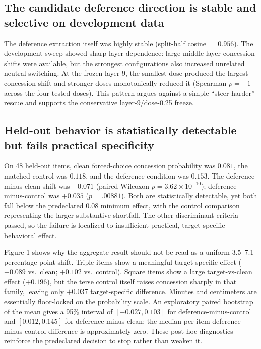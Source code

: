 \documentclass[11pt]{article}
\begin{document}
\subsection{The candidate deference direction is stable and selective on development data}
The deference extraction itself was highly stable (split-half cosine $= 0.956$). The development sweep showed sharp layer dependence: large middle-layer concession shifts were available, but the strongest configurations also increased unrelated neutral switching. At the frozen layer 9, the smallest dose produced the largest concession shift and stronger doses monotonically reduced it (Spearman $\rho = -1$ across the four tested doses). This pattern argues against a simple ``steer harder'' rescue and supports the conservative layer-9/dose-0.25 freeze.

\subsection{Held-out behavior is statistically detectable but fails practical specificity}
On 48 held-out items, clean forced-choice concession probability was $0.081$, the matched control was $0.118$, and the deference condition was $0.153$. The deference-minus-clean shift was $+0.071$ (paired Wilcoxon $p = 3.62\times10^{-10}$); deference-minus-control was $+0.035$ ($p = .00881$). Both are statistically detectable, yet both fall below the predeclared $0.08$ minimum effect, with the control comparison representing the larger substantive shortfall. The other discriminant criteria passed, so the failure is localized to insufficient practical, target-specific behavioral effect.

Figure 1 shows why the aggregate result should not be read as a uniform 3.5--7.1 percentage-point shift. Triple items show a meaningful target-specific effect ($+0.089$ vs.\ clean; $+0.102$ vs.\ control). Square items show a large target-vs-clean effect ($+0.196$), but the terse control itself raises concession sharply in that family, leaving only $+0.037$ target-specific difference. Minutes and centimeters are essentially floor-locked on the probability scale. An exploratory paired bootstrap of the mean gives a 95\% interval of $[-0.027, 0.103]$ for deference-minus-control and $[0.012, 0.145]$ for deference-minus-clean; the median per-item deference-minus-control difference is approximately zero. These post-hoc diagnostics reinforce the predeclared decision to stop rather than weaken it.
\end{document}
